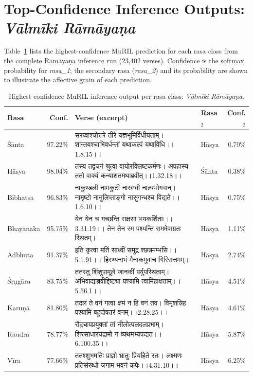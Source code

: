 \documentclass[11pt]{article}
\newcommand{\skt}[1]{{\devanagarifont #1}}
\newcommand{\skt}[1]{#1}
\begin{document}
\section{Top-Confidence Inference Outputs: \textit{V\=alm\=iki R\=am\=aya\d na}}
\label{sec:ramayana_top}

Table~\ref{tab:ramayana_top} lists the highest-confidence MuRIL prediction for each rasa class from the complete R\=am\=aya\d na inference run (23,402 verses). Confidence is the softmax probability for \textit{rasa\_1}; the secondary rasa (\textit{rasa\_2}) and its probability are shown to illustrate the affective grain of each prediction.

\begin{table}[htbp]
\centering
\small
\caption{Highest-confidence MuRIL inference output per rasa class: \textit{V\=alm\=iki R\=am\=aya\d na}.}
\label{tab:ramayana_top}
\begin{tabular}{lrp{8.5cm}lr}
\toprule
Rasa & Conf. & Verse (excerpt) & Rasa$_2$ & Conf.$_2$ \\
\midrule
Ś\=anta    & 97.22\% & \skt{सरय्वाश्चोत्तरे तीरे यज्ञभूमिर्विधीयताम्। शान्तयश्चाभिवर्धन्तां यथाकल्पं यथाविधि।।1.8.15।।} & H\=asya & 0.70\% \\
H\=asya    & 98.04\% & \skt{तस्य तद्वचनं श्रुत्वा वायोरक्लिष्टकर्मणः। अपहास्य ततो वाक्यं कन्याशतमथाब्रवीत्।।1.32.18।।} & Ś\=anta & 0.38\% \\
B\=ibhatsa & 96.83\% & \skt{नाकुण्डली नामकुटी नास्रग्वी नाल्पभोगवान्। नामृष्टो नानुलिप्ताङ्गो नासुगन्धश्च विद्यते।।1.6.10।।} & H\=asya & 0.75\% \\
Bhay\=anaka & 95.75\% & \skt{येन येन च गच्छन्ति राक्षसा भयकर्शिताः।।3.31.19।। तेन तेन स्म पश्यन्ति राममेवाग्रतः स्थितम्।} & H\=asya & 1.11\% \\
Adbhuta   & 91.37\% & \skt{इति कृत्वा मतिं साध्वीं समुद्र श्छन्नमम्भसि।।5.1.91।। हिरण्यनाभं मैनाकमुवाच गिरिसत्तमम्।} & H\=asya & 2.74\% \\
Ś\d r\d ng\=ara & 83.75\% & \skt{ततस्तु शिंशुपामूले जानकीं पर्युपस्थिताम्। अभिवाद्याब्रवीद्दिष्ट्या पश्यामि त्वामिहाक्षताम्।।5.56.1।।} & H\=asya & 4.51\% \\
Karu\d n\=a & 81.80\% & \skt{तदलं ते वनं गत्वा क्षमं न हि वनं तव। विमृशन्निह पश्यामि बहुदोषतरं वनम्।।2.28.25।।} & H\=asya & 4.61\% \\
Raudra    & 78.77\% & \skt{रौद्रचापप्रयुक्तां तां नीलोत्पलदलप्रभाम्। शिरसाधारयद्रामो न व्यथमभ्यपद्यत।।6.100.35।।} & H\=asya & 5.87\% \\
V\=ira     & 77.66\% & \skt{ततश्शुभमतिः प्राज्ञो भ्रातुः प्रियहिते रतः। लक्ष्मणः प्रतिसंरब्धो जगाम भवनं कपेः।।4.31.10।।} & H\=asya & 6.25\% \\
\bottomrule
\end{tabular}
\end{table}
\end{document}
